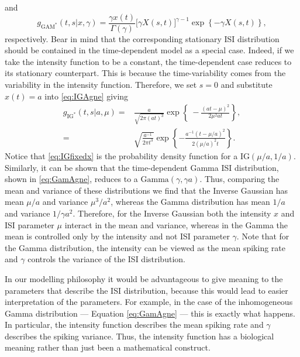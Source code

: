 \documentclass[oneside, 12 pt]{book}
\begin{document}
 and
 \begin{equation}\label{eq:GamAgne}
 	 g_{\mathrm{GAM^*}}(t,s| x, \gamma) =  \frac{\gamma x(t)}{\Gamma ( \gamma )} \big[ \gamma X(s,t) \big]^{\gamma -1} \exp \left\{ - \gamma X(s,t)  \right\},
 \end{equation}
respectively. Bear in mind that the corresponding stationary ISI distribution should be contained in the time-dependent model as a special case. Indeed, if we take the intensity function to be a constant, the time-dependent case reduces to its stationary counterpart. This is because the time-variability comes from the variability in the intensity function. Therefore, we set $s=0$ and substitute $x(t) = a$ into \eqref{eq:IGAgne}  giving
\begin{align}\label{eq:IGfixedx}
	 g_{\mathrm{IG^*}}(t,s| a,\mu) =& \frac{a}{\sqrt{2 \pi (at)^3}} \exp \left\{\ - \frac{(at- \mu)^2}{2\mu^2 at} \right\}, \nonumber \\
	 =& \sqrt{ \frac{a^{-1}}{2 \pi t^3} } \exp \left\{- \frac{a^{-1}\left( t - \mu/a \right)^2}{2\left(\mu /a \right)^2t}  \right\}. 
\end{align} 
Notice that \eqref{eq:IGfixedx} is the probability density function for a $\mathrm{IG}(\mu/a, 1/a)$. Similarly, it can be shown that the time-dependent Gamma ISI distribution, shown in \eqref{eq:GamAgne}, reduces to a $\mathrm{Gamma}(\gamma, \gamma a)$. Thus, comparing the mean and variance of these distributions we find that the Inverse Gaussian has mean $\mu /a$ and variance $\mu^3 / a^2$, whereas the Gamma distribution has mean $1/a$ and variance $1/\gamma a^2$. Therefore, for the Inverse Gaussian both the intensity $x$ and ISI parameter $\mu$ interact in the mean and variance, whereas in the Gamma the mean is controlled only by the intensity and not ISI parameter $\gamma$. Note that for the Gamma distribution, the intensity can be viewed as the mean spiking rate and $\gamma$ controls the variance of the ISI distribution. 

In our modelling philosophy it would be advantageous to give meaning to the parameters that describe the ISI distribution, because this would lead to easier interpretation of the parameters. For example, in the case of the inhomogeneous Gamma distribution --- Equation \eqref{eq:GamAgne} --- this is exactly what happens. In particular, the intensity function describes the mean spiking rate and $\gamma$ describes the spiking variance. Thus, the intensity function has a biological meaning rather than just been a mathematical construct. 
\end{document}
